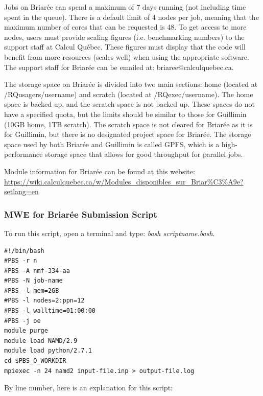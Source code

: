 \documentclass[12pt]{article}
\begin{document}
\quad Jobs on Briar\'{e}e can spend a maximum of 7 days running (not including time spent in the queue). There is a default limit of 4 nodes per job, meaning that the maximum number of cores that can be requested is 48. To get access to more nodes, users must provide scaling figures (i.e. benchmarking numbers) to the support staff at Calcul Qu\'{e}bec. These figures must display that the code will benefit from more resources (scales well) when using the appropriate software. The support staff for Briar\'{e}e can be emailed at: briaree@calculquebec.ca.

\quad The storage space on Briar\'{e}e is divided into two main sections: home (located at /RQusagers/username) and scratch (located at /RQexec/username). The home space is backed up, and the scratch space is not backed up. These spaces do not have a specified quota, but the limits should be similar to those for Guillimin (10GB home, 1TB scratch). The scratch space is not cleared for Briar\'{e}e as it is for Guillimin, but there is no designated project space for Briar\'{e}e. The storage space used by both Briar\'{e}e and Guillimin is called GPFS, which is a high-performance storage space that allows for good throughput for parallel jobs.

\quad Module information for Briar\'{e}e can be found at this website: \url{https://wiki.calculquebec.ca/w/Modules_disponibles_sur_Briar%C3%A9e?setlang=en}

\subsubsection{MWE for Briar\'{e}e Submission Script}
\quad To run this script, open a terminal and type: \textit{bash scriptname.bash}. 
\begin{lstlisting}
#!/bin/bash
#PBS -r n
#PBS -A nmf-334-aa
#PBS -N job-name
#PBS -l mem=2GB
#PBS -l nodes=2:ppn=12
#PBS -l walltime=01:00:00
#PBS -j oe
module purge
module load NAMD/2.9
module load python/2.7.1
cd $PBS_O_WORKDIR
mpiexec -n 24 namd2 input-file.inp > output-file.log
\end{lstlisting}

\quad By line number, here is an explanation for this script:
\end{document}
